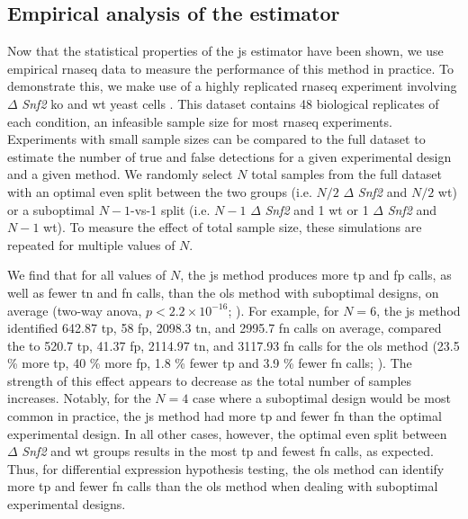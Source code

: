 \subsection{Empirical analysis of the  estimator}

Now that the statistical properties of the \gls{js} estimator have been shown, we use empirical \gls{rnaseq} data to measure the performance of this method in practice.
To demonstrate this, we make use of a highly replicated \gls{rnaseq} experiment involving $\Delta$ \emph{Snf2} \gls{ko} and \gls{wt} yeast cells \cite{gierlinskiStatisticalModelsRNAseq2015}.
This dataset contains 48 biological replicates of each condition, an infeasible sample size for most \gls{rnaseq} experiments.
Experiments with small sample sizes can be compared to the full dataset to estimate the number of true and false detections for a given experimental design and a given method.
We randomly select $N$ total samples from the full dataset with an optimal even split between the two groups (i.e. $N / 2$ $\Delta$ \emph{Snf2} and $N / 2$ \gls{wt}) or a suboptimal $N - 1$-vs-1 split (i.e. $N - 1$ $\Delta$ \emph{Snf2} and 1 \gls{wt} or 1 $\Delta$ \emph{Snf2} and $N - 1$ \gls{wt}).
To measure the effect of total sample size, these simulations are repeated for multiple values of $N$.

We find that for all values of $N$, the \gls{js} method produces more \gls{tp} and \gls{fp} calls, as well as fewer \gls{tn} and \gls{fn} calls, than the \gls{ols} method with suboptimal designs, on average (two-way \gls{anova}, $p < 2.2 \times 10^{-16}$; ).
For example, for $N = 6$, the \gls{js} method identified 642.87 \gls{tp}, 58 \gls{fp}, 2098.3 \gls{tn}, and 2995.7 \gls{fn} calls on average, compared the to 520.7 \gls{tp}, 41.37 \gls{fp}, 2114.97 \gls{tn}, and 3117.93 \gls{fn} calls for the \gls{ols} method (23.5 \% more \gls{tp}, 40 \% more \gls{fp}, 1.8 \% fewer \gls{tp} and 3.9 \% fewer \gls{fn} calls; ).
The strength of this effect appears to decrease as the total number of samples increases.
Notably, for the $N = 4$ case where a suboptimal design would be most common in practice, the \gls{js} method had more \gls{tp} and fewer \gls{fn} than the optimal experimental design.
In all other cases, however, the optimal even split between $\Delta $ \emph{Snf2} and \gls{wt} groups results in the most \gls{tp} and fewest \gls{fn} calls, as expected.
Thus, for differential expression hypothesis testing, the \gls{ols} method can identify more \gls{tp} and fewer \gls{fn} calls than the \gls{ols} method when dealing with suboptimal experimental designs.


